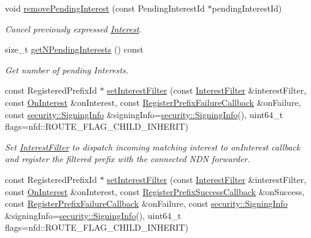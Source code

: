 \begin{DoxyCompactItemize}
void \hyperlink{classndn_1_1Face_a3d62143eb6c8fc963cf850a5629c3f63}{remove\+Pending\+Interest} (const Pending\+Interest\+Id $\ast$pending\+Interest\+Id)
\begin{DoxyCompactList}\small\item\em Cancel previously expressed \hyperlink{classndn_1_1Interest}{Interest}. \end{DoxyCompactList}\item 
size\+\_\+t \hyperlink{classndn_1_1Face_aa611e634ff49e5d693bbf10412c7a773}{get\+N\+Pending\+Interests} () const\hypertarget{classndn_1_1Face_aa611e634ff49e5d693bbf10412c7a773}{}\label{classndn_1_1Face_aa611e634ff49e5d693bbf10412c7a773}

\begin{DoxyCompactList}\small\item\em Get number of pending Interests. \end{DoxyCompactList}\item 
const Registered\+Prefix\+Id $\ast$ \hyperlink{classndn_1_1Face_a89b613696d4e0c9839b555973b1d690a}{set\+Interest\+Filter} (const \hyperlink{classndn_1_1InterestFilter}{Interest\+Filter} \&interest\+Filter, const \hyperlink{namespacendn_a6ddca075866d76508a3dd3b15533cac2}{On\+Interest} \&on\+Interest, const \hyperlink{namespacendn_a691d213d0f708593217feeae517f3e45}{Register\+Prefix\+Failure\+Callback} \&on\+Failure, const \hyperlink{classndn_1_1security_1_1SigningInfo}{security\+::\+Signing\+Info} \&signing\+Info=\hyperlink{classndn_1_1security_1_1SigningInfo}{security\+::\+Signing\+Info}(), uint64\+\_\+t flags=nfd\+::\+R\+O\+U\+T\+E\+\_\+\+F\+L\+A\+G\+\_\+\+C\+H\+I\+L\+D\+\_\+\+I\+N\+H\+E\+R\+IT)
\begin{DoxyCompactList}\small\item\em Set \hyperlink{classndn_1_1InterestFilter}{Interest\+Filter} to dispatch incoming matching interest to on\+Interest callback and register the filtered prefix with the connected N\+DN forwarder. \end{DoxyCompactList}\item 
const Registered\+Prefix\+Id $\ast$ \hyperlink{classndn_1_1Face_a3dfdbf9764e7e628e4daf29606155d02}{set\+Interest\+Filter} (const \hyperlink{classndn_1_1InterestFilter}{Interest\+Filter} \&interest\+Filter, const \hyperlink{namespacendn_a6ddca075866d76508a3dd3b15533cac2}{On\+Interest} \&on\+Interest, const \hyperlink{namespacendn_a80b158f94737f73bec3f9af27161e899}{Register\+Prefix\+Success\+Callback} \&on\+Success, const \hyperlink{namespacendn_a691d213d0f708593217feeae517f3e45}{Register\+Prefix\+Failure\+Callback} \&on\+Failure, const \hyperlink{classndn_1_1security_1_1SigningInfo}{security\+::\+Signing\+Info} \&signing\+Info=\hyperlink{classndn_1_1security_1_1SigningInfo}{security\+::\+Signing\+Info}(), uint64\+\_\+t flags=nfd\+::\+R\+O\+U\+T\+E\+\_\+\+F\+L\+A\+G\+\_\+\+C\+H\+I\+L\+D\+\_\+\+I\+N\+H\+E\+R\+IT)

\end{DoxyCompactItemize}
